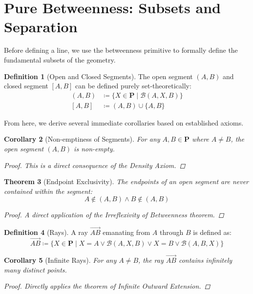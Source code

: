 \documentclass[12pt, letterpaper]{article}
\newtheorem{theorem}{Theorem}[section]
\newtheorem{corollary}[theorem]{Corollary}
\theoremstyle{definition}
\newtheorem{definition}[theorem]{Definition}
\newcommand{\B}{\mathcal{B}}
\newcommand{\Pset}{\mathbf{P}}
\newcommand{\ray}[1]{\overrightarrow{#1}}
\begin{document}
\section{Pure Betweenness: Subsets and Separation}
Before defining a line, we use the betweenness primitive to formally define the fundamental subsets of the geometry.

\begin{definition}[Open and Closed Segments]
    The open segment $(A,B)$ and closed segment $[A,B]$ can be defined purely set-theoretically:
    \begin{align*}
        (A, B) &\coloneq \{X \in \Pset \mid \B(A, X, B)\} \\
        [A, B] &\coloneq (A, B) \cup \{A, B\}
    \end{align*}
\end{definition}

From here, we derive several immediate corollaries based on established axioms.

\begin{corollary}[Non-emptiness of Segments]
    For any $A, B \in \Pset$ where $A \neq B$, the open segment $(A, B)$ is non-empty.
    \begin{proof}
        This is a direct consequence of the Density Axiom.
    \end{proof}
\end{corollary}

\begin{theorem}[Endpoint Exclusivity]
    The endpoints of an open segment are never contained within the segment:
    \[ A \notin (A,B) \land B \notin (A,B) \]
    \begin{proof}
        A direct application of the Irreflexivity of Betweenness theorem.
    \end{proof}
\end{theorem}

\begin{definition}[Rays]
    A ray $\ray{AB}$ emanating from $A$ through $B$ is defined as:
    \[ \ray{AB} \coloneq \{X \in \Pset \mid X = A \lor \B(A, X, B) \lor X = B \lor \B(A, B, X)\} \]
\end{definition}

\begin{corollary}[Infinite Rays]
    For any $A \neq B$, the ray $\ray{AB}$ contains infinitely many distinct points.
    \begin{proof}
        Directly applies the theorem of Infinite Outward Extension.
    \end{proof}
\end{corollary}
\end{document}
